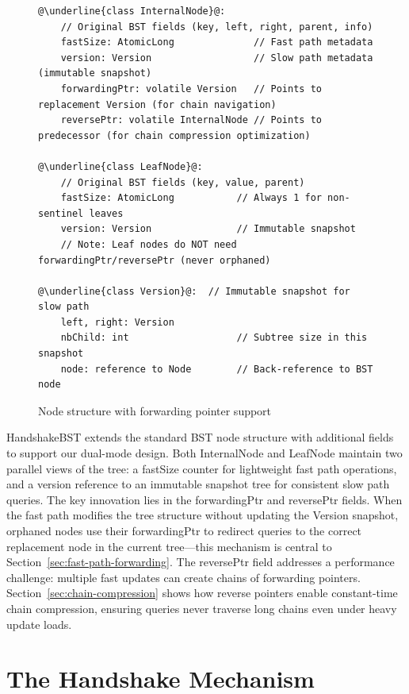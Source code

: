 \documentclass[acmsmall,screen,nonacm]{acmart}
\newcommand{\codestyle}[1]{{{\fontsize{9}{10}\ttfamily #1}}}
\begin{document}
\begin{figure}[H]
\begin{lstlisting}
@\underline{class InternalNode}@:
    // Original BST fields (key, left, right, parent, info)
    fastSize: AtomicLong              // Fast path metadata
    version: Version                  // Slow path metadata (immutable snapshot)
    forwardingPtr: volatile Version   // Points to replacement Version (for chain navigation)
    reversePtr: volatile InternalNode // Points to predecessor (for chain compression optimization)

@\underline{class LeafNode}@:
    // Original BST fields (key, value, parent)
    fastSize: AtomicLong           // Always 1 for non-sentinel leaves
    version: Version               // Immutable snapshot
    // Note: Leaf nodes do NOT need forwardingPtr/reversePtr (never orphaned)

@\underline{class Version}@:  // Immutable snapshot for slow path
    left, right: Version
    nbChild: int                   // Subtree size in this snapshot
    node: reference to Node        // Back-reference to BST node
\end{lstlisting}
\caption{Node structure with forwarding pointer support}
\label{fig:node-structure-next}
\end{figure}

HandshakeBST extends the standard BST node structure with additional fields to support our dual-mode design. Both \codestyle{InternalNode} and \codestyle{LeafNode} maintain two parallel views of the tree: a \codestyle{fastSize} counter for lightweight fast path operations, and a \codestyle{version} reference to an immutable snapshot tree for consistent slow path queries. The key innovation lies in the \codestyle{forwardingPtr} and \codestyle{reversePtr} fields. When the fast path modifies the tree structure without updating the Version snapshot, orphaned nodes use their \codestyle{forwardingPtr} to redirect queries to the correct replacement node in the current tree—this mechanism is central to Section~\ref{sec:fast-path-forwarding}. The \codestyle{reversePtr} field addresses a performance challenge: multiple fast updates can create chains of forwarding pointers. Section~\ref{sec:chain-compression} shows how reverse pointers enable constant-time chain compression, ensuring queries never traverse long chains even under heavy update loads.

\section{The Handshake Mechanism}
\end{document}
